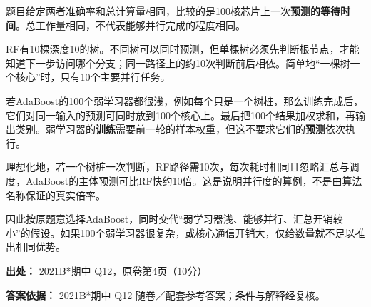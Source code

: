 题目给定两者准确率和总计算量相同，比较的是100核芯片上一次\textbf{预测的等待时间}。总工作量相同，不代表能够并行完成的程度相同。


RF有10棵深度10的树。不同树可以同时预测，但单棵树必须先判断根节点，才能知道下一步访问哪个分支；同一路径上的约10次判断前后相依。简单地“一棵树一个核心”时，只有10个主要并行任务。


若AdaBoost的100个弱学习器都很浅，例如每个只是一个树桩，那么训练完成后，它们对同一输入的预测可同时放到100个核心上。最后把100个结果加权求和，再输出类别。弱学习器的\textbf{训练}需要前一轮的样本权重，但这不要求它们的\textbf{预测}依次执行。


理想化地，若一个树桩一次判断，RF路径需10次，每次耗时相同且忽略汇总与调度，AdaBoost的主体预测可比RF快约10倍。这是说明并行度的算例，不是由算法名称保证的真实倍率。


因此按原题意选择AdaBoost，同时交代“弱学习器浅、能够并行、汇总开销较小”的假设。如果100个弱学习器很复杂，或核心通信开销大，仅给数量就不足以推出相同优势。


\textbf{出处：} 2021B*期中 Q12，原卷第4页（10分）


\textbf{答案依据：} 2021B*期中 Q12 随卷／配套参考答案；条件与解释经复核。
